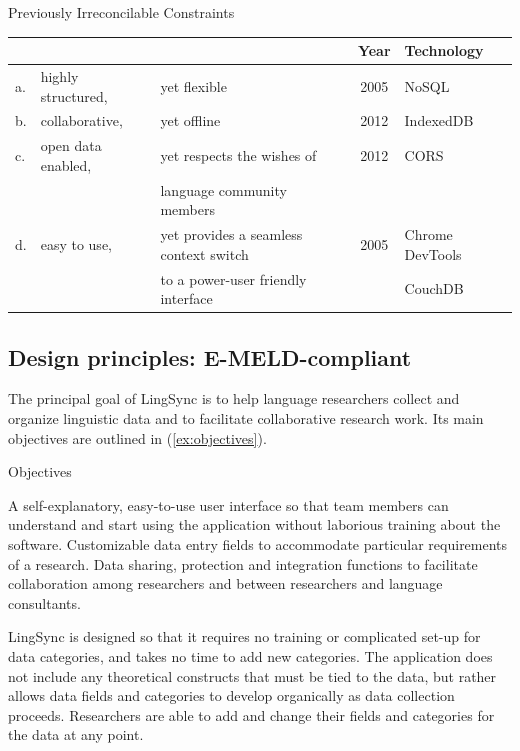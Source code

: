 \documentclass[letterpaper, 12pt, dvips]{mitwpl}
\begin{document}
\begin{exe}
\ex  Previously Irreconcilable Constraints

\begin{tabular}{lllcl}
&& & Year & Technology \\\hline\hline
a. & highly structured, & yet flexible & 2005 & NoSQL\\\hline
b. & collaborative, & yet offline  & 2012 &  IndexedDB\\\hline
c. & open data enabled,  &yet respects the wishes of & 2012 & CORS \\
&&   language community members \\\hline
d. & easy to use,  &yet provides a seamless context switch  & 2005 & Chrome DevTools  \\
&& to a power-user friendly interface && CouchDB
\end{tabular}
\label{ex:Irreconcilable}
\end{exe}



\subsection{Design principles: E-MELD-compliant} 
\label{sec:design}

The principal goal of LingSync is to help language researchers collect and organize linguistic data and to facilitate collaborative research work. Its main objectives are outlined in (\ref{ex:objectives}).

\begin{exe} 
\ex Objectives

\begin{xlist}
        \ex  A self-explanatory, easy-to-use user interface so that team members can understand and start using the application without laborious training about the software.
        \ex Customizable data entry fields to accommodate particular requirements of a research.  
        \ex  Data sharing, protection and integration functions to facilitate collaboration among researchers and between researchers and language consultants. 
    \end{xlist}
\label{ex:objectives}
\end{exe}

\noindent LingSync is designed so that it requires no training or complicated set-up for data categories, and takes no time to add new categories.  The application does not include any theoretical constructs that must be tied to the data, but rather allows data fields and categories to develop organically as data collection proceeds. Researchers are able to add and change their fields and categories for the data at any point. 
\end{document}
